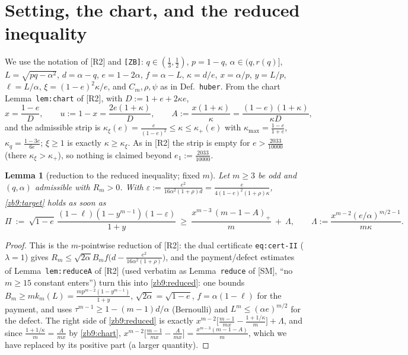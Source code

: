 \documentclass[11pt]{article}
\newtheorem{lemma}{Lemma}[section]
\theoremstyle{remark}
\newcommand{\eps}{\varepsilon}
\newcommand{\kxi}{\kappa_\xi}
\newcommand{\kq}{\kappa_q}
\newcommand{\kmx}{\kappa_{\max}}
\newcommand{\khi}{\kappa_{+}}
\newcommand{\RII}{[R2]}
\newcommand{\SM}{[SM]}
\begin{document}
\section{Setting, the chart, and the reduced inequality}\label{zb9:sec:setup}

We use the notation of \RII{} and \texttt{[ZB]}: $q\in(\tfrac13,\tfrac12)$,
$p=1-q$, $\alpha\in(q,r(q)]$, $L=\sqrt{pq-\alpha^2}$, $d=\alpha-q$,
$e=1-2\alpha$, $f=\alpha-L$, $\kappa=d/e$, $x=\alpha/p$, $y=L/p$,
$\ell=L/\alpha$, $\xi=(1-e)^2\kappa/e$, and $C_m,\rho,\psi$ as in
Def.~\texttt{huber}.  From the chart Lemma~\texttt{lem:chart} of \RII, with
$D:=1+e+2\kappa e$,
\begin{equation}\label{zb9:chart}
        x=\frac{1-e}{D},\qquad u:=1-x=\frac{2e(1+\kappa)}{D},\qquad
        A:=\frac{x(1+\kappa)}{\kappa}=\frac{(1-e)(1+\kappa)}{\kappa D},
\end{equation}
and the admissible strip is $\kxi(e)=\tfrac{e}{(1-e)^2}\le\kappa\le\khi(e)$
with $\kmx=\tfrac{1-e}{1+e}$, $\kq=\tfrac{1-3e}{6e}$; $\xi\ge1$ is exactly
$\kappa\ge\kxi$.  As in \RII{} the strip is empty for
$e>\tfrac{2033}{10000}$ (there $\kxi>\khi$), so nothing is claimed beyond
$e_1:=\tfrac{2033}{10000}$.

\begin{lemma}[reduction to the reduced inequality; fixed $m$]\label{zb9:red}
Let $m\ge3$ be odd and $(q,\alpha)$ admissible with $R_m>0$.  With
$\eps:=\frac{e^2}{16\alpha^2(1+\rho)d}=\frac{e}{4(1-e)^2(1+\rho)\kappa}$,
\eqref{zb9:target} holds as soon as
\begin{equation}\label{zb9:reduced}
        \Pi\ :=\ \sqrt{1-e}\,\frac{(1-\ell)(1-y^{m-1})(1-\eps)}{1+y}
        \ \ge\ \frac{x^{m-3}\,(m-1-A)_+}{m}\ +\ \Lambda,
        \qquad
        \Lambda:=\frac{x^{m-2}(e/\alpha)^{m/2-1}}{m\kappa}.
\end{equation}
\end{lemma}

\begin{proof}
This is the $m$-pointwise reduction of \RII: the dual certificate
\texttt{eq:cert-II} ($\lambda=1$) gives
$R_m\le\sqrt{2\alpha}B_mf\bigl(d-\tfrac{e^2}{16\alpha^2(1+\rho)}\bigr)$, and
the payment/defect estimates of Lemma~\texttt{lem:reduceA} of \RII{} (used
verbatim as Lemma~\texttt{reduce} of \SM, ``no $m\ge15$ constant enters'')
turn this into \eqref{zb9:reduced}: one bounds
$B_m\ge mk_m(L)=\tfrac{mp^{m-2}(1-y^{m-1})}{1+y}$, $\sqrt{2\alpha}=\sqrt{1-e}$,
$f=\alpha(1-\ell)$ for the payment, and uses
$\tau^{m-1}\ge1-(m-1)d/\alpha$ (Bernoulli) and $L^m\le(\alpha e)^{m/2}$ for
the defect.  The right side of \eqref{zb9:reduced} is exactly
$x^{m-2}\bigl[\tfrac{m-1}{mx}-\tfrac{1+1/\kappa}{m}\bigr]+\Lambda$, and since
$\tfrac{1+1/\kappa}{m}=\tfrac{A}{mx}$ by \eqref{zb9:chart},
$x^{m-2}\bigl[\tfrac{m-1}{mx}-\tfrac{A}{mx}\bigr]=\tfrac{x^{m-3}(m-1-A)}{m}$,
which we have replaced by its positive part (a larger quantity).
\end{proof}
\end{document}
